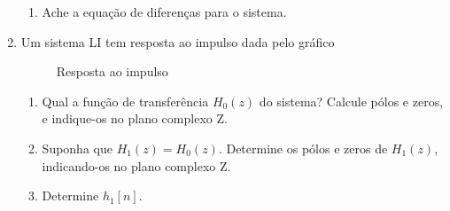 \documentclass[a4paper,10pt]{article}
\begin{document}
\begin{enumerate}
\begin{enumerate}
			\item Ache a equação de diferenças para o sistema.
		\end{enumerate}
	\item Um sistema LI tem resposta ao impulso dada pelo gráfico
		\begin{figure*}
			\centering
			\label{fig:h0}
			\caption{Resposta ao impulso}
		\end{figure*}
		\begin{enumerate}
			\item Qual a função de transferência $H_0(z)$ do sistema? Calcule pólos e zeros, e indique-os no plano complexo Z.
			\item Suponha que $H_1(z) = H_0(z)$. Determine os pólos e zeros de $H_1(z)$, indicando-os no plano complexo Z.
			\item Determine $h_1[n]$.
		\end{enumerate}
\end{enumerate}
\end{document}
